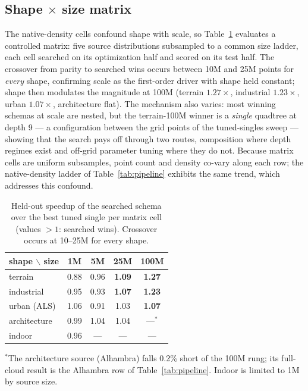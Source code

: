 

\subsection{Shape $\times$ size matrix}
\label{sec:eval-matrix}

The native-density cells confound shape with scale, so Table~\ref{tab:matrix} evaluates a controlled matrix: five source distributions subsampled to a common size ladder, each cell searched on its optimization half and scored on its test half. The crossover from parity to searched wins occurs between 10M and 25M points for \emph{every} shape, confirming scale as the first-order driver with shape held constant; shape then modulates the magnitude at 100M (terrain $1.27\times$, industrial $1.23\times$, urban $1.07\times$, architecture flat). The mechanism also varies: most winning schemas at scale are nested, but the terrain-100M winner is a \emph{single} quadtree at depth 9 --- a configuration between the grid points of the tuned-singles sweep --- showing that the search pays off through two routes, composition where depth regimes exist and off-grid parameter tuning where they do not. Because matrix cells are uniform subsamples, point count and density co-vary along each row; the native-density ladder of Table~\ref{tab:pipeline} exhibits the same trend, which addresses this confound.

\begin{table}[t]
  \centering
  \caption{Held-out speedup of the searched schema over the best tuned single per matrix cell (values $>1$: searched wins). Crossover occurs at 10--25M for every shape.}
  \label{tab:matrix}
  \small
  \begin{tabular}{lcccc}
    \toprule
    shape $\backslash$ size & 1M & 5M & 25M & 100M \\
    \midrule
    terrain      & 0.88 & 0.96 & \textbf{1.09} & \textbf{1.27} \\
    industrial   & 0.95 & 0.93 & \textbf{1.07} & \textbf{1.23} \\
    urban (ALS)  & 1.06 & 0.91 & 1.03 & \textbf{1.07} \\
    architecture & 0.99 & 1.04 & 1.04 & ---$^{\ast}$ \\
    indoor       & 0.96 & --- & --- & --- \\
    \bottomrule
  \end{tabular}

  \smallskip
  \raggedright\footnotesize $^{\ast}$The architecture source (Alhambra) falls 0.2\% short of the 100M rung; its full-cloud result is the Alhambra row of Table~\ref{tab:pipeline}. Indoor is limited to 1M by source size.
\end{table}


